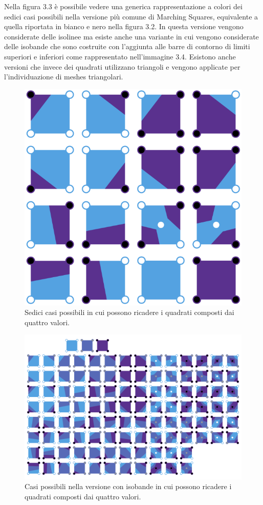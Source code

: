 \documentclass[12pt,a4paper]{report}
\begin{document}
Nella figura 3.3 è possibile vedere una generica rappresentazione a colori dei sedici casi possibili nella versione più comune di Marching Squares, equivalente a quella riportata in bianco e nero nella figura 3.2.
In questa versione vengono considerate delle isolinee ma esiste anche una variante in cui vengono considerate delle isobande che sono costruite con l'aggiunta alle barre di contorno di limiti superiori e inferiori come rappresentato nell'immagine 3.4. \newline Esistono anche versioni che invece dei quadrati utilizzano triangoli e vengono applicate per l'individuazione di meshes triangolari.
\begin{figure}[H]
    \centering
    \includegraphics[scale=0.32]{img/Marching_squares_isolines.svg.png}
    \caption{Sedici casi possibili in cui possono ricadere i quadrati composti dai quattro valori.}
\end{figure}
\begin{figure}[H]
    \centering
    \includegraphics[scale=0.17]{img/Marching_squares_isobands.svg.png}
    \caption{Casi possibili nella versione con isobande in cui possono ricadere i quadrati composti dai quattro valori.}
\end{figure}
\end{document}
